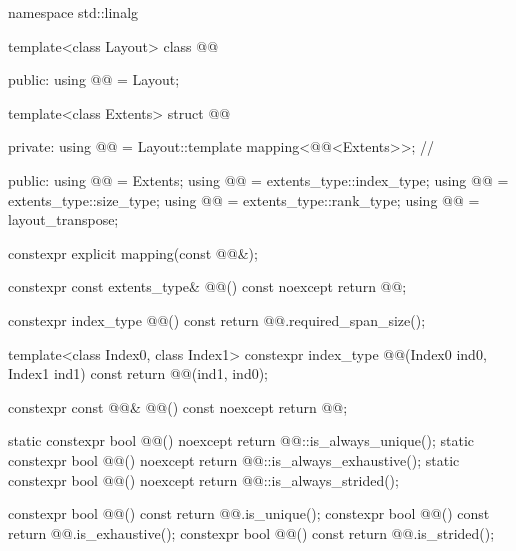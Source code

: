 \begin{codeblock}
namespace std::linalg {
  template<class Layout>
  class @@ {
  public:
    using @@ = Layout;

    template<class Extents>
    struct @@ {
    private:
      using @@ =
        Layout::template mapping<@@<Extents>>;  // \expos

    public:
      using @@ = Extents;
      using @@ = extents_type::index_type;
      using @@ = extents_type::size_type;
      using @@ = extents_type::rank_type;
      using @@ = layout_transpose;

      constexpr explicit mapping(const @@&);

      constexpr const extents_type& @@() const noexcept { return @@; }

      constexpr index_type @@() const
        { return @@.required_span_size(); }

      template<class Index0, class Index1>
        constexpr index_type @@(Index0 ind0, Index1 ind1) const
        { return @@(ind1, ind0); }

      constexpr const @@& @@() const noexcept
        { return @@; }

      static constexpr bool @@() noexcept
        { return @@::is_always_unique(); }
      static constexpr bool @@() noexcept
        { return @@::is_always_exhaustive(); }
      static constexpr bool @@() noexcept
        { return @@::is_always_strided(); }

      constexpr bool @@() const { return @@.is_unique(); }
      constexpr bool @@() const { return @@.is_exhaustive(); }
      constexpr bool @@() const { return @@.is_strided(); }

}}}
\end{codeblock}
